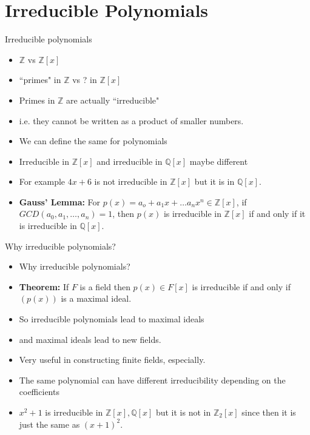\documentclass[ %
 10pt, xcolor={dvipsnames,svgnames,x11names,hyperref},
   hyperref={colorlinks=true,citecolor=green,linkcolor=DarkRed,urlcolor=ProcessBlue,anchorcolor=blue}
  ]{beamer}
\newenvironment{stepitemize}{\begin{itemize}[<+->]}{\end{itemize} }
\newcommand{\Z}{\mathbb{Z}}
\newcommand{\Q}{\mathbb{Q}}
\begin{document}
\section{Irreducible Polynomials}
\begin{frame}{Irreducible polynomials}
\begin{stepitemize}
\item $\Z$ vs $\Z[x]$
\item ``primes" in $\Z$ vs ? in $\Z[x]$
\item Primes in $\Z$ are actually ``irreducible"
\item i.e. they cannot be written as a product of smaller numbers.
\item We can define the same for polynomials
\item Irreducible in $\Z[x]$ and irreducible in $\Q[x]$ maybe different
\item For example $4x+6$ is not irreducible in $\Z[x]$ but it is in $\Q[x]$.
\item {\bf Gauss' Lemma:} For $p(x)=a_o+a_1x+\dots a_nx^n \in \Z[x]$, if
$GCD(a_0, a_1, \dots, a_n)=1$, then $p(x)$ is irreducible in $\Z[x]$ if and only if it is irreducible in $\Q[x]$.
\end{stepitemize}
\end{frame}

\begin{frame}{Why irreducible polynomials?}
\begin{stepitemize}
    \item Why irreducible polynomials?
    \item {\bf Theorem:} If $F$ is a field then $p(x)\in F[x]$ is irreducible if and only if $(p(x))$ is a maximal ideal. \item So irreducible polynomials lead to maximal ideals
    \item and maximal ideals lead to new fields.
    \item Very useful in constructing finite fields, especially.
    \item The same polynomial can have different irreducibility depending on the coefficients
    \item $x^2+1$ is irreducible in $\Z[x], \Q[x]$ but it is not in $\Z_2[x]$ since then it is just the same as $(x+1)^2$.
\end{stepitemize}
\end{frame}
\end{document}

